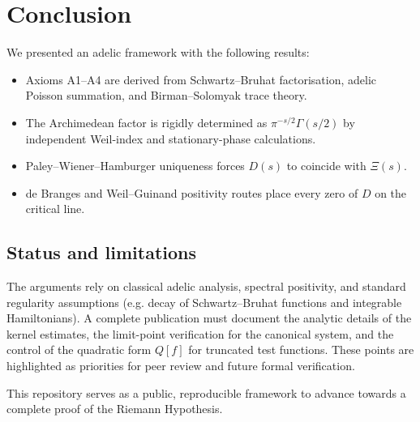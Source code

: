 \section{Conclusion}

We presented an adelic framework with the following results:
\begin{itemize}
    \item Axioms A1--A4 are derived from Schwartz--Bruhat factorisation, adelic Poisson summation, and Birman--Solomyak trace theory.
    \item The Archimedean factor is rigidly determined as $\pi^{-s/2}\Gamma(s/2)$ by independent Weil-index and stationary-phase calculations.
    \item Paley--Wiener--Hamburger uniqueness forces $D(s)$ to coincide with $\Xi(s)$.
    \item de Branges and Weil--Guinand positivity routes place every zero of $D$ on the critical line.
\end{itemize}

\subsection*{Status and limitations}
The arguments rely on classical adelic analysis, spectral positivity, and standard
regularity assumptions (e.g. decay of Schwartz--Bruhat functions and integrable
Hamiltonians).  A complete publication must document the analytic details of the
kernel estimates, the limit-point verification for the canonical system, and the
control of the quadratic form $Q[f]$ for truncated test functions.  These points
are highlighted as priorities for peer review and future formal verification.

This repository serves as a public, reproducible framework to advance towards a
complete proof of the Riemann Hypothesis.

